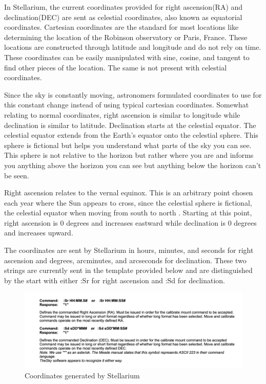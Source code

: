 \documentclass[12pt]{report}
\begin{document}
\begin{enumerate}
In Stellarium, the current coordinates provided for right ascension(RA) and declination(DEC) are sent as celestial coordinates, also known as equatorial coordinates. Cartesian coordinates are the standard for most locations like determining the location of the Robinson observatory or Paris, France. These locations are constructed through latitude and longitude and do not rely on time. These coordinates can be easily manipulated with sine, cosine, and tangent to find other pieces of the location. The same is not present with celestial coordinates.

Since the sky is constantly moving, astronomers formulated coordinates to use for this constant change instead of using typical cartesian coordinates. Somewhat relating to normal coordinates, right ascension is similar to longitude while declination is similar to latitude. Declination starts at the celestial equator. The celestial equator extends from the Earth’s equator onto the celestial sphere. This sphere is fictional but helps you understand what parts of the sky you can see. This sphere is not relative to the horizon but rather where you are and informs you anything above the horizon you can see but anything below the horizon can’t be seen.

Right ascension relates to the vernal equinox. This is an arbitrary point chosen each year where the Sun appears to cross, since the celestial sphere is fictional, the celestial equator when moving from south to north \cite{celestial}. Starting at this point, right ascension is 0 degrees and increases eastward while declination is 0 degrees and increases upward.

The coordinates are sent by Stellarium in hours, minutes, and seconds for right ascension and degrees, arcminutes, and arcseconds for declination. These two strings are currently sent in the template provided below and are distinguished by the start with either :Sr for right ascension and :Sd for declination.

\begin{figure}[h]
  \centering
  \includegraphics[width=\linewidth]{convStell}
  \caption{Coordinates generated by Stellarium}
  \label{fig:conStell}
\end{figure}


\end{enumerate}
\end{document}
